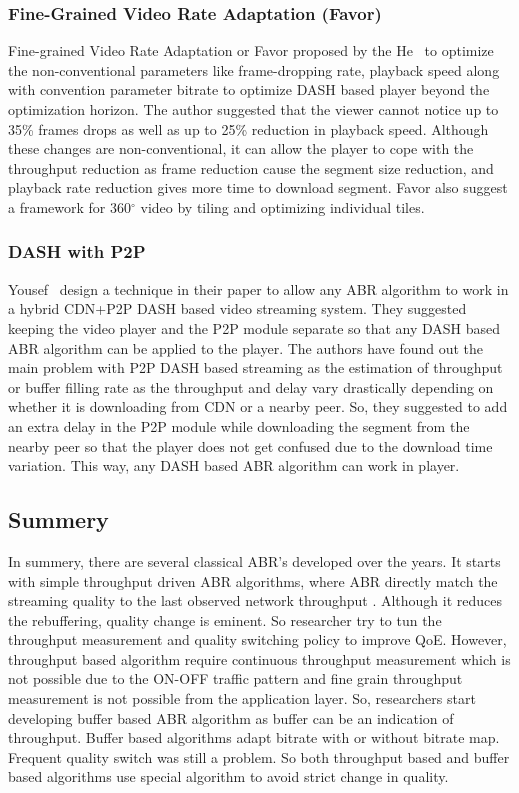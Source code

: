 \subsubsection{Fine-Grained Video Rate Adaptation (Favor)}
Fine-grained Video Rate Adaptation or Favor\cite{10.1145/3204949.3204957} proposed by the He \etal\ to optimize the non-conventional parameters like frame-dropping rate, playback speed along with convention parameter bitrate to optimize DASH based player beyond the optimization horizon. The author suggested that the viewer cannot notice up to 35\% frames drops as well as up to 25\% reduction in playback speed. Although these changes are non-conventional, it can allow the player to cope with the throughput reduction as frame reduction cause the segment size reduction, and playback rate reduction gives more time to download segment. Favor also suggest a framework for 360$^{\circ}$ video by tiling and optimizing individual tiles.

\subsubsection{DASH with P2P}
Yousef \etal\ design a technique in their paper \cite{10.1145/3339825.3391859} to allow any ABR algorithm to work in a hybrid CDN+P2P DASH based video streaming system. They suggested keeping the video player and the P2P module separate so that any DASH based ABR algorithm can be applied to the player. The authors have found out the main problem with P2P DASH based streaming as the estimation of throughput or buffer filling rate as the throughput and delay vary drastically depending on whether it is downloading from CDN or a nearby peer. So, they suggested to add an extra delay in the P2P module while downloading the segment from the nearby peer so that the player does not get confused due to the download time variation. This way, any DASH based ABR algorithm can work in player.

\subsection{Summery}
In summery, there are several classical ABR's developed over the years. It starts with simple throughput driven ABR algorithms, where ABR directly match the streaming quality to the last observed network throughput \cite{5677508,10.1145/1943552.1943575,10.1145/1943552.1943574}. Although it reduces the rebuffering, quality change is eminent. So researcher try to tun the throughput measurement and quality switching policy to improve QoE. However, throughput based algorithm require continuous throughput measurement which is not possible due to the ON-OFF traffic pattern and fine grain throughput measurement is not possible from the application layer. So, researchers start developing buffer based ABR algorithm as buffer can be an indication of throughput. Buffer based algorithms adapt bitrate with or without bitrate map. Frequent quality switch was still a problem. So both throughput based and buffer based algorithms use special algorithm to avoid strict change in quality.

